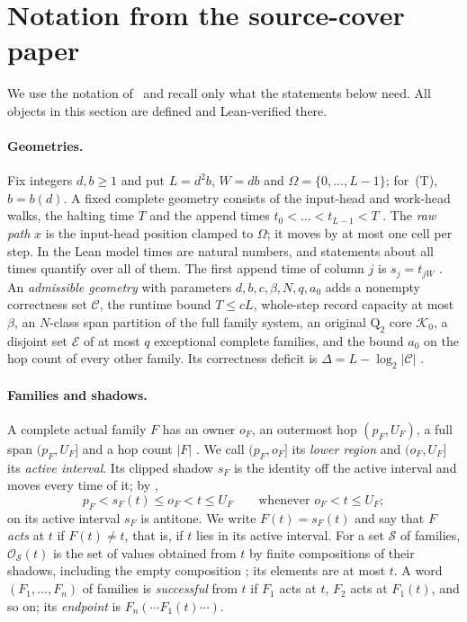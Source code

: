 \section{Notation from the source-cover paper}\label{sec:preliminaries}

We use the notation of~\cite{SourceCovers2026} and recall only what the statements
below need. All objects in this section are defined and Lean-verified there.

\paragraph{Geometries.}
Fix integers $d,b\ge1$ and put $L=d^2b$, $W=db$ and $\Omega=\{0,\dots,L-1\}$; for~(T),
$b=b(d)$. A fixed complete geometry consists of the input-head and work-head walks,
the halting time $T$ and the append times $t_0<\dots<t_{L-1}<T$
\cite[Section~2.1]{SourceCovers2026}. The \emph{raw path} $x$ is the input-head
position clamped to $\Omega$; it moves by at most one cell per step. In the Lean model
times are natural numbers, and statements about all times quantify over all of them.
The first append time of column $j$ is $s_j=t_{jW}$
\cite[Theorem~2.9]{SourceCovers2026}. An \emph{admissible geometry} with parameters
$d,b,c,\beta,N,q,a_0$ \cite[Definition~2.2]{SourceCovers2026} adds a nonempty
correctness set $\mathcal C$, the runtime bound $T\le cL$, whole-step record capacity
at most $\beta$, an $N$-class span partition of the full family system, an original
$\mathrm Q_2$ core $\mathcal K_0$, a disjoint set $\mathcal E$ of at most $q$
exceptional complete families, and the bound $a_0$ on the hop count of every other
family. Its correctness deficit is $\Delta=L-\log_2|\mathcal C|$
\cite[(2.2)]{SourceCovers2026}.

\paragraph{Families and shadows.}
A complete actual family $F$ has an owner $o_F$, an outermost hop $(p_F,U_F)$, a full
span $(p_F,U_F]$ and a hop count $|F|$ \cite[Definition~2.1]{SourceCovers2026}.
We call $(p_F,o_F]$ its \emph{lower region} and $(o_F,U_F]$ its \emph{active
interval}. Its clipped shadow $s_F$ is the identity off the active interval and moves
every time of it; by \cite[Definition~2.4 and (2.6)]{SourceCovers2026},
\begin{equation}\label{eq:strict-shadow}
 p_F<s_F(t)\le o_F<t\le U_F\qquad\text{whenever }o_F<t\le U_F;
\end{equation}
on its active interval $s_F$ is antitone. We write $F(t)=s_F(t)$ and say that $F$
\emph{acts} at $t$ if $F(t)\ne t$, that is, if $t$ lies in its active interval.
For a set $\mathcal S$ of families, $\mathcal O_{\mathcal S}(t)$ is the set of values
obtained from $t$ by finite compositions of their shadows, including the empty
composition \cite[Definition~2.4]{SourceCovers2026}; its elements are at most $t$.
A word $(F_1,\dots,F_n)$ of families is \emph{successful} from $t$ if $F_1$ acts at
$t$, $F_2$ acts at $F_1(t)$, and so on; its \emph{endpoint} is
$F_n(\cdots F_1(t)\cdots)$.

